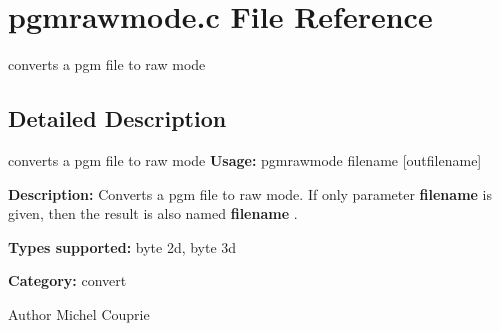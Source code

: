 \section{pgmrawmode.c File Reference}
\label{pgmrawmode_8c}


converts a pgm file to raw mode  




\subsection{Detailed Description}
converts a pgm file to raw mode {\bfseries Usage:} pgmrawmode filename [outfilename]

{\bfseries Description:} Converts a pgm file to raw mode. If only parameter {\bfseries filename} is given, then the result is also named {\bfseries filename} .

{\bfseries Types supported:} byte 2d, byte 3d

{\bfseries Category:} convert

\begin{DoxyAuthor}{Author}
Michel Couprie 
\end{DoxyAuthor}
